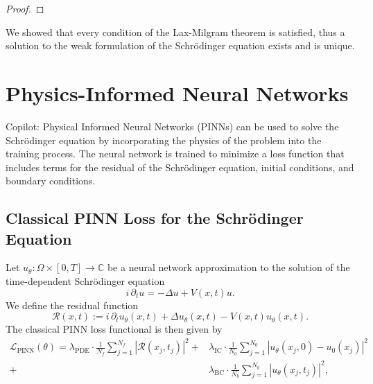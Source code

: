 \documentclass{article}
\theoremstyle{definition}
\theoremstyle{plain}
\theoremstyle{remark}
\begin{document}
\begin{proof}
\end{proof}
We showed that every condition of the Lax-Milgram theorem is satisfied, thus a solution to the weak formulation of the Schrödinger equation exists and is unique.


\section{Physics-Informed Neural Networks}

Copilot:
Physical Informed Neural Networks (PINNs) can be used to solve the Schrödinger equation by incorporating the physics of the problem into the training process. The neural network is trained to minimize a loss function that includes terms for the residual of the Schrödinger equation, initial conditions, and boundary conditions.

\subsection*{Classical PINN Loss for the Schrödinger Equation}

Let $u_\theta : \Omega \times [0,T] \to \mathbb{C}$ be a neural network approximation to the solution of the time-dependent Schrödinger equation
\[
i \, \partial_t u = -\Delta u + V(x,t) u.
\]
We define the residual function
\[
\mathcal{R}(x,t) := i \, \partial_t u_\theta(x,t) + \Delta u_\theta(x,t) - V(x,t) u_\theta(x,t).
\]
The classical PINN loss functional is then given by
\begin{align*}
\mathcal{L}_{\mathrm{PINN}}(\theta) =
\lambda_{\mathrm{PDE}} \cdot \frac{1}{N_f} \sum_{j=1}^{N_f} \left| \mathcal{R}(x_j, t_j) \right|^2
+& \lambda_{\mathrm{IC}} \cdot \frac{1}{N_0} \sum_{j=1}^{N_0} \left| u_\theta(x_j, 0) - u_0(x_j) \right|^2\\
+& \lambda_{\mathrm{BC}} \cdot \frac{1}{N_b} \sum_{j=1}^{N_b} \left| u_\theta(x_j, t_j) \right|^2,    
\end{align*}
\end{document}

